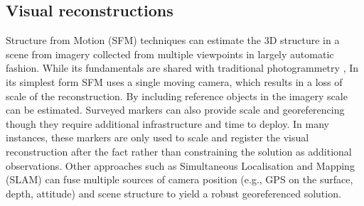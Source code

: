 \subsection{Visual reconstructions}
Structure from Motion (SFM) techniques \cite{Hartley_2004} can estimate the 3D structure in a scene from imagery collected from multiple viewpoints in largely automatic fashion. While its fundamentals are shared with traditional photogrammetry \cite{Jones_1982},   In its simplest form SFM uses a single moving camera, which results in a loss of scale of the reconstruction. By including reference objects in the imagery scale can be estimated. Surveyed markers can also provide scale and georeferencing though they require additional infrastructure and time to deploy. In many instances, these markers are only used to scale and register the visual reconstruction after the fact rather than constraining the solution as additional observations.
Other approaches such as Simultaneous Localisation and Mapping (SLAM) \cite{Thrun_2008} can fuse multiple sources of camera position (e.g., GPS on the surface, depth, attitude) and scene structure to yield a robust georeferenced solution.

